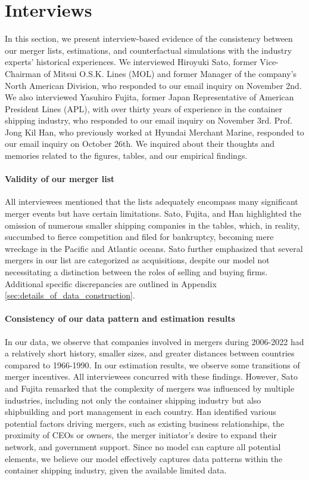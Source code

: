 \documentclass[10pt]{article}
\begin{document}
\section{Interviews}\label{sec:interviews}
In this section, we present interview-based evidence of the consistency between our merger lists, estimations, and counterfactual simulations with the industry experts' historical experiences. We interviewed Hiroyuki Sato, former Vice-Chairman of Mitsui O.S.K. Lines (MOL) and former Manager of the company's North American Division, who responded to our email inquiry on November 2nd. We also interviewed Yasuhiro Fujita, former Japan Representative of American President Lines (APL), with over thirty years of experience in the container shipping industry, who responded to our email inquiry on November 3rd. Prof. Jong Kil Han, who previously worked at Hyundai Merchant Marine, responded to our email inquiry on October 26th. We inquired about their thoughts and memories related to the figures, tables, and our empirical findings.

\paragraph{Validity of our merger list}

All interviewees mentioned that the lists adequately encompass many significant merger events but have certain limitations.
Sato, Fujita, and Han highlighted the omission of numerous smaller shipping companies in the tables, which, in reality, succumbed to fierce competition and filed for bankruptcy, becoming mere wreckage in the Pacific and Atlantic oceans. 
Sato further emphasized that several mergers in our list are categorized as acquisitions, despite our model not necessitating a distinction between the roles of selling and buying firms. 
Additional specific discrepancies are outlined in Appendix \ref{sec:details_of_data_construction}.

\paragraph{Consistency of our data pattern and estimation results}
In our data, we observe that companies involved in mergers during 2006-2022 had a relatively short history, smaller sizes, and greater distances between countries compared to 1966-1990. 
In our estimation results, we observe some transitions of merger incentives. 
All interviewees concurred with these findings. 
However, Sato and Fujita remarked that the complexity of mergers was influenced by multiple industries, including not only the container shipping industry but also shipbuilding and port management in each country. 
Han identified various potential factors driving mergers, such as existing business relationships, the proximity of CEOs or owners, the merger initiator's desire to expand their network, and government support. 
Since no model can capture all potential elements, we believe our model effectively captures data patterns within the container shipping industry, given the available limited data.
\end{document}
